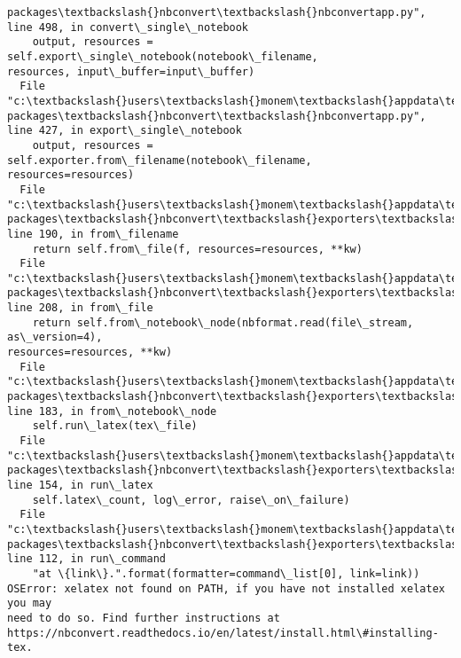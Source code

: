 \documentclass[11pt]{article}
\begin{document}
\begin{Verbatim}[commandchars=\\\{\}]
packages\textbackslash{}nbconvert\textbackslash{}nbconvertapp.py", line 498, in convert\_single\_notebook
    output, resources = self.export\_single\_notebook(notebook\_filename,
resources, input\_buffer=input\_buffer)
  File "c:\textbackslash{}users\textbackslash{}monem\textbackslash{}appdata\textbackslash{}local\textbackslash{}programs\textbackslash{}python\textbackslash{}python37\textbackslash{}lib\textbackslash{}site-
packages\textbackslash{}nbconvert\textbackslash{}nbconvertapp.py", line 427, in export\_single\_notebook
    output, resources = self.exporter.from\_filename(notebook\_filename,
resources=resources)
  File "c:\textbackslash{}users\textbackslash{}monem\textbackslash{}appdata\textbackslash{}local\textbackslash{}programs\textbackslash{}python\textbackslash{}python37\textbackslash{}lib\textbackslash{}site-
packages\textbackslash{}nbconvert\textbackslash{}exporters\textbackslash{}exporter.py", line 190, in from\_filename
    return self.from\_file(f, resources=resources, **kw)
  File "c:\textbackslash{}users\textbackslash{}monem\textbackslash{}appdata\textbackslash{}local\textbackslash{}programs\textbackslash{}python\textbackslash{}python37\textbackslash{}lib\textbackslash{}site-
packages\textbackslash{}nbconvert\textbackslash{}exporters\textbackslash{}exporter.py", line 208, in from\_file
    return self.from\_notebook\_node(nbformat.read(file\_stream, as\_version=4),
resources=resources, **kw)
  File "c:\textbackslash{}users\textbackslash{}monem\textbackslash{}appdata\textbackslash{}local\textbackslash{}programs\textbackslash{}python\textbackslash{}python37\textbackslash{}lib\textbackslash{}site-
packages\textbackslash{}nbconvert\textbackslash{}exporters\textbackslash{}pdf.py", line 183, in from\_notebook\_node
    self.run\_latex(tex\_file)
  File "c:\textbackslash{}users\textbackslash{}monem\textbackslash{}appdata\textbackslash{}local\textbackslash{}programs\textbackslash{}python\textbackslash{}python37\textbackslash{}lib\textbackslash{}site-
packages\textbackslash{}nbconvert\textbackslash{}exporters\textbackslash{}pdf.py", line 154, in run\_latex
    self.latex\_count, log\_error, raise\_on\_failure)
  File "c:\textbackslash{}users\textbackslash{}monem\textbackslash{}appdata\textbackslash{}local\textbackslash{}programs\textbackslash{}python\textbackslash{}python37\textbackslash{}lib\textbackslash{}site-
packages\textbackslash{}nbconvert\textbackslash{}exporters\textbackslash{}pdf.py", line 112, in run\_command
    "at \{link\}.".format(formatter=command\_list[0], link=link))
OSError: xelatex not found on PATH, if you have not installed xelatex you may
need to do so. Find further instructions at
https://nbconvert.readthedocs.io/en/latest/install.html\#installing-tex.
    \end{Verbatim}
\end{document}
